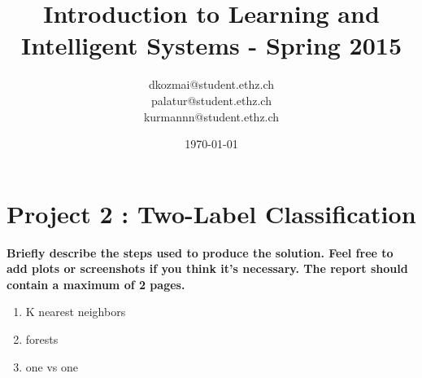 \documentclass[a4paper, 11pt]{article}
\title{Introduction to Learning and Intelligent Systems - Spring 2015}
\author{dkozmai@student.ethz.ch\\ palatur@student.ethz.ch\\ kurmannn@student.ethz.ch\\}
\date{\today}
\begin{document}
\maketitle

\section*{Project 2 : Two-Label Classification}

\textbf{Briefly describe the steps used to produce the solution. Feel
free to add plots or screenshots if you think it's necessary. The
report should contain a maximum of 2 pages.
}



\begin{enumerate}
	\item{K nearest neighbors}
	\item{forests}
	\item{one vs one}
\end{enumerate}
\end{document}
